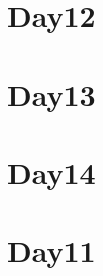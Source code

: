 
\section*{Day12}

\vfill
\section*{Day13}

\vfill
\section*{Day14}

\vfill
\section*{Day11}

\vfill
